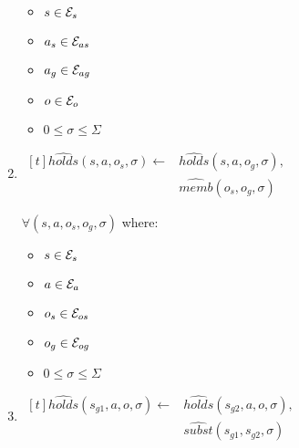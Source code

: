 \documentclass[10pt, twocolumn]{article}
\begin{document}
\begin{enumerate}
                \begin{itemize}
                  \item
                    $s \in {\cal E}_{s}$
                  \item
                    $a_{s} \in {\cal E}_{as}$
                  \item
                    $a_{g} \in {\cal E}_{ag}$
                  \item
                    $o \in {\cal E}_{o}$
                  \item
                    $0 \leq \sigma \leq \Sigma$
                \end{itemize}
              \item
                \begin{math}
                  \begin{aligned}[t]
                    \hat{holds}(s, a, o_{s}, \sigma) \leftarrow &
                    \hat{holds}(s, a, o_{g}, \sigma), \\
                    & \hat{memb}(o_{s}, o_{g}, \sigma)
                  \end{aligned}
                \end{math}

                $\forall (s, a, o_{s}, o_{g}, \sigma)$ where:

                \begin{itemize}
                  \item
                    $s \in {\cal E}_{s}$
                  \item
                    $a \in {\cal E}_{a}$
                  \item
                    $o_{s} \in {\cal E}_{os}$
                  \item
                    $o_{g} \in {\cal E}_{og}$
                  \item
                    $0 \leq \sigma \leq \Sigma$
                \end{itemize}
              \item
                \begin{math}
                  \begin{aligned}[t]
                    \hat{holds}(s_{g1}, a, o, \sigma) \leftarrow &
                    \hat{holds}(s_{g2}, a, o, \sigma), \\
                    & \hat{subst}(s_{g1}, s_{g2}, \sigma)
                  \end{aligned}
                \end{math}


\end{enumerate}
\end{document}
